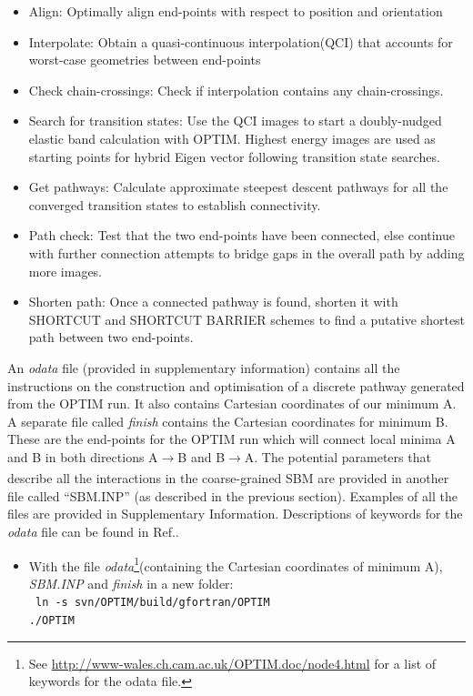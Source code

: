 \documentclass[journal=jacsat]{achemso}
\begin{document}
\begin{itemize}
    
    \item {Align: Optimally align end-points with respect to position and orientation}
    \item {Interpolate: Obtain a quasi-continuous interpolation\cite{QCI1,QCI2}(QCI) that accounts for worst-case geometries between end-points}
    \item{Check chain-crossings: Check if interpolation contains any chain-crossings.}
    \item{Search for transition states: Use the QCI images to start a doubly-nudged elastic band calculation with OPTIM\cite{OPTIM}. Highest energy images are used as starting points for hybrid Eigen vector following\cite{HEVF1,HEVF2} transition state searches.}
    \item{Get pathways: Calculate approximate steepest descent pathways for all the converged transition states to establish connectivity.}
    \item{Path check: Test that the two end-points have been connected, else continue with further connection attempts to bridge gaps in the overall path by adding more images.}
    \item{Shorten path: Once a connected pathway is found, shorten it with SHORTCUT\cite{Carr05a} and SHORTCUT BARRIER \cite{Strodel07a} schemes to find a putative shortest path between two end-points.}
\end{itemize}

An \emph{odata} file (provided in supplementary information) contains all the instructions on the construction and optimisation of a discrete pathway generated from the OPTIM run. It also contains Cartesian coordinates of our minimum A. A separate file called \emph{finish} contains the Cartesian coordinates for minimum B. These are the end-points for the OPTIM run which will connect local minima A and B in both directions A$\xrightarrow[]{}$B and B$\xrightarrow[]{}$A. The potential parameters that describe all the interactions in the coarse-grained SBM are provided in another file called ``SBM.INP'' (as described in the previous section). Examples of all the files are provided in Supplementary Information. Descriptions of keywords for the \emph{odata} file can be found in Ref.\cite{OPTIM,OPTIMex}. 

\begin{itemize}
\small
\item{With the file \emph{odata}\footnote{See \url{http://www-wales.ch.cam.ac.uk/OPTIM.doc/node4.html} for a list of keywords for the odata file.}(containing the Cartesian coordinates of minimum A), \emph{SBM.INP} and \emph{finish} in a new  folder: \\ \tt{ ln -s svn/OPTIM/build/gfortran/OPTIM} \\ \tt{./OPTIM}}

\end{itemize}
\end{document}
